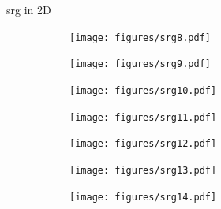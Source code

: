 \documentclass{beamer}
\begin{document}
\begin{frame}{\Ac{srg} in 2D}
\begin{tcolorbox}[boxsep=1pt,left=0pt,right=0pt,top=0pt,bottom=0pt,title=round 2]
\begin{figure}[h]
\begin{subfigure}[b]{0.15\linewidth}
\centering
  \texttt{[image: figures/srg8.pdf]}
\end{subfigure}%
\begin{subfigure}[b]{0.15\linewidth}%
\centering
  \texttt{[image: figures/srg9.pdf]}
\end{subfigure}%
\begin{subfigure}[b]{0.15\linewidth}%
\centering
  \texttt{[image: figures/srg10.pdf]}
\end{subfigure}%
\begin{subfigure}[b]{0.15\linewidth}%
\centering
  \texttt{[image: figures/srg11.pdf]}
\end{subfigure}%
\end{figure}
\end{tcolorbox}
\begin{tcolorbox}[boxsep=1pt,left=0pt,right=0pt,top=0pt,bottom=0pt,title=round 3]
\begin{figure}
\begin{subfigure}[b]{0.15\linewidth}%
\centering
  \texttt{[image: figures/srg12.pdf]}
\end{subfigure}%
\begin{subfigure}[b]{0.15\linewidth}%
\centering
  \texttt{[image: figures/srg13.pdf]}
\end{subfigure}%
\begin{subfigure}[b]{0.15\linewidth}%
\centering
  \texttt{[image: figures/srg14.pdf]}
\end{subfigure}%
\end{figure}
\end{tcolorbox}
\end{frame}
\end{document}
